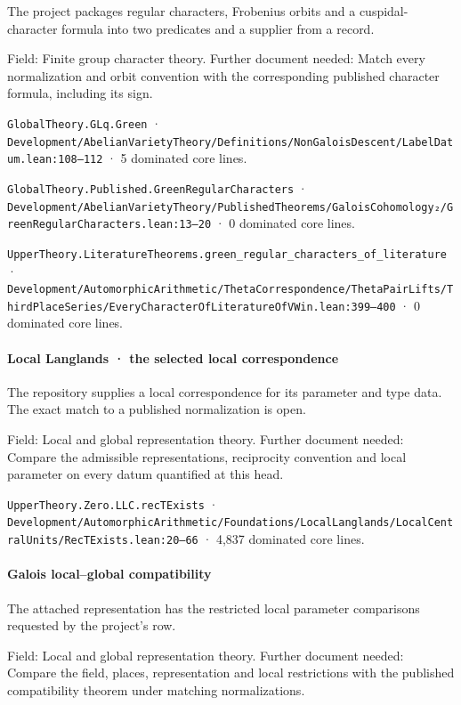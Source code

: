 The project packages regular characters, Frobenius orbits and a cuspidal-character formula into two predicates and a supplier from a record.

Field: Finite group character theory. Further document needed: Match every normalization and orbit convention with the corresponding published character formula, including its sign.

\nolinkurl{GlobalTheory.GLq.Green} · \nolinkurl{Development/AbelianVarietyTheory/Definitions/NonGaloisDescent/LabelDatum.lean:108–112} · 5 dominated core lines.

\nolinkurl{GlobalTheory.Published.GreenRegularCharacters} · \nolinkurl{Development/AbelianVarietyTheory/PublishedTheorems/GaloisCohomology₂/GreenRegularCharacters.lean:13–20} · 0 dominated core lines.

\nolinkurl{UpperTheory.LiteratureTheorems.green_regular_characters_of_literature} · \nolinkurl{Development/AutomorphicArithmetic/ThetaCorrespondence/ThetaPairLifts/ThirdPlaceSeries/EveryCharacterOfLiteratureOfVWin.lean:399–400} · 0 dominated core lines.

\paragraph{Local Langlands · the selected local correspondence}

The repository supplies a local correspondence for its parameter and type data. The exact match to a published normalization is open.

Field: Local and global representation theory. Further document needed: Compare the admissible representations, reciprocity convention and local parameter on every datum quantified at this head.

\nolinkurl{UpperTheory.Zero.LLC.recTExists} · \nolinkurl{Development/AutomorphicArithmetic/Foundations/LocalLanglands/LocalCentralUnits/RecTExists.lean:20–66} · 4,837 dominated core lines.

\paragraph{Galois local–global compatibility}

The attached representation has the restricted local parameter comparisons requested by the project’s row.

Field: Local and global representation theory. Further document needed: Compare the field, places, representation and local restrictions with the published compatibility theorem under matching normalizations.

